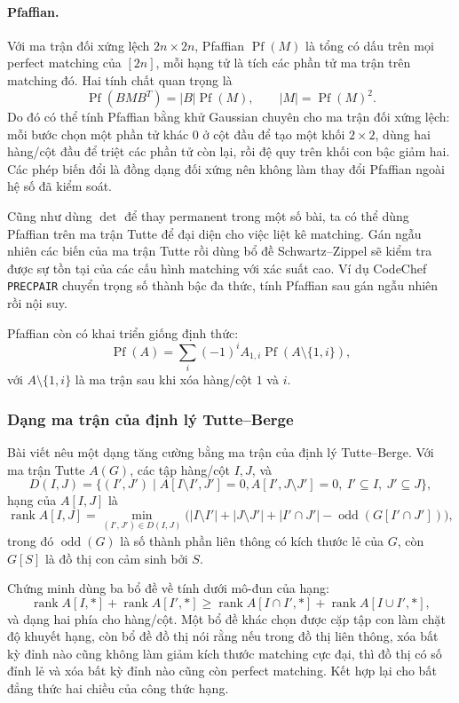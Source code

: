 \documentclass[11pt]{article}
\begin{document}
\paragraph{Pfaffian.}
Với ma trận đối xứng lệch $2n\times 2n$, Pfaffian $\operatorname{Pf}(M)$ là tổng
có dấu trên mọi perfect matching của $[2n]$, mỗi hạng tử là tích các phần tử ma
trận trên matching đó. Hai tính chất quan trọng là
\[
  \operatorname{Pf}(BMB^T)=|B|\operatorname{Pf}(M),\qquad
  |M|=\operatorname{Pf}(M)^2.
\]
Do đó có thể tính Pfaffian bằng khử Gaussian chuyên cho ma trận đối xứng lệch:
mỗi bước chọn một phần tử khác $0$ ở cột đầu để tạo một khối $2\times2$, dùng
hai hàng/cột đầu để triệt các phần tử còn lại, rồi đệ quy trên khối con bậc giảm
hai. Các phép biến đổi là đồng dạng đối xứng nên không làm thay đổi Pfaffian
ngoài hệ số đã kiểm soát.

Cũng như dùng $\det$ để thay permanent trong một số bài, ta có thể dùng
Pfaffian trên ma trận Tutte để đại diện cho việc liệt kê matching. Gán ngẫu
nhiên các biến của ma trận Tutte rồi dùng bổ đề Schwartz--Zippel sẽ kiểm tra
được sự tồn tại của các cấu hình matching với xác suất cao. Ví dụ CodeChef
\texttt{PRECPAIR} chuyển trọng số thành bậc đa thức, tính Pfaffian sau gán ngẫu
nhiên rồi nội suy.

Pfaffian còn có khai triển giống định thức:
\[
  \operatorname{Pf}(A)
  =\sum_i (-1)^i A_{1,i}\operatorname{Pf}(A\setminus\{1,i\}),
\]
với $A\setminus\{1,i\}$ là ma trận sau khi xóa hàng/cột $1$ và $i$.

\subsubsection{Dạng ma trận của định lý Tutte--Berge}

Bài viết nêu một dạng tăng cường bằng ma trận của định lý Tutte--Berge. Với ma
trận Tutte \(A(G)\), các tập hàng/cột \(I,J\), và
\[
  D(I,J)=\{(I',J')\mid A[I\setminus I',J']=0,
  A[I',J\setminus J']=0,\ I'\subseteq I,\ J'\subseteq J\},
\]
hạng của \(A[I,J]\) là
\[
  \operatorname{rank} A[I,J]
  =
  \min_{(I',J')\in D(I,J)}
  \bigl(|I\setminus I'|+|J\setminus J'|
  + |I'\cap J'|-\operatorname{odd}(G[I'\cap J'])\bigr),
\]
trong đó \(\operatorname{odd}(G)\) là số thành phần liên thông có kích thước lẻ
của \(G\), còn \(G[S]\) là đồ thị con cảm sinh bởi \(S\).

Chứng minh dùng ba bổ đề về tính dưới mô-đun của hạng:
\[
  \operatorname{rank}A[I,*]+\operatorname{rank}A[I',*]
  \ge
  \operatorname{rank}A[I\cap I',*]+\operatorname{rank}A[I\cup I',*],
\]
và dạng hai phía cho hàng/cột. Một bổ đề khác chọn được cặp tập con làm chặt độ
khuyết hạng, còn bổ đề đồ thị nói rằng nếu trong đồ thị liên thông, xóa bất kỳ
đỉnh nào cũng không làm giảm kích thước matching cực đại, thì đồ thị có số đỉnh
lẻ và xóa bất kỳ đỉnh nào cũng còn perfect matching. Kết hợp lại cho bất đẳng
thức hai chiều của công thức hạng.
\end{document}
